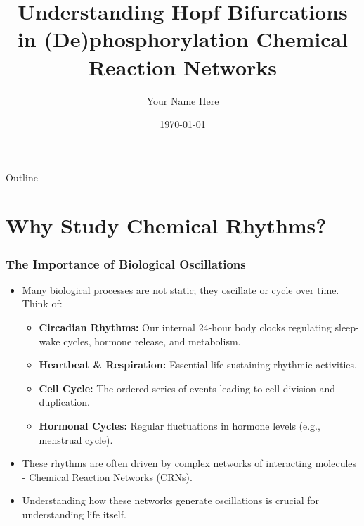 \documentclass[aspectratio=169]{beamer}
\title[Hopf Bifurcations in CRNs]{Understanding Hopf Bifurcations in (De)phosphorylation Chemical Reaction Networks}
\author{Your Name Here}
\date{\today}
\institute{Your Institution Here}
\begin{document}
\begin{frame}[plain]
	\titlepage
\end{frame}

\begin{frame}{Outline}
	\tableofcontents
\end{frame}

\section{Why Study Chemical Rhythms?}

\begin{frame}{\insertsectionhead}
	\frametitle{The Importance of Biological Oscillations}
	\begin{itemize}
		\item Many biological processes are not static; they \alert{oscillate} or cycle over time. Think of:
			\begin{itemize}
				\item \textbf{Circadian Rhythms:} Our internal 24-hour body clocks regulating sleep-wake cycles, hormone release, and metabolism.
				\item \textbf{Heartbeat \& Respiration:} Essential life-sustaining rhythmic activities.
				\item \textbf{Cell Cycle:} The ordered series of events leading to cell division and duplication.
				\item \textbf{Hormonal Cycles:} Regular fluctuations in hormone levels (e.g., menstrual cycle).
			\end{itemize}
		\item These rhythms are often driven by complex networks of interacting molecules - \alert{Chemical Reaction Networks (CRNs)}.
		\item Understanding how these networks generate oscillations is crucial for understanding life itself.
	\end{itemize}
\end{frame}
\end{document}
